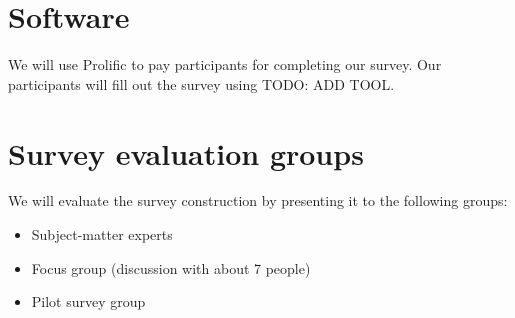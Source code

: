 \documentclass[%
class=scrreprt,
chapterprefix=false,%
open=right,%
twoside=false,%
paper=a4,%
logofile={Logo\_zentral\_farbig\_EN.png},%
thesistype=masterproposal,%
UKenglish,%
]{se2thesis}
\begin{document}
\section{Software}
We will use Prolific to pay participants for completing our survey. Our participants will fill out the survey using TODO: ADD TOOL.

\section{Survey evaluation groups} \label{sec:survey-evaluation}
We will evaluate the survey construction by presenting it to the following groups:
\begin{itemize}
	\item Subject-matter experts
	\item Focus group (discussion with about 7 people)
	\item Pilot survey group
\end{itemize}
\end{document}
